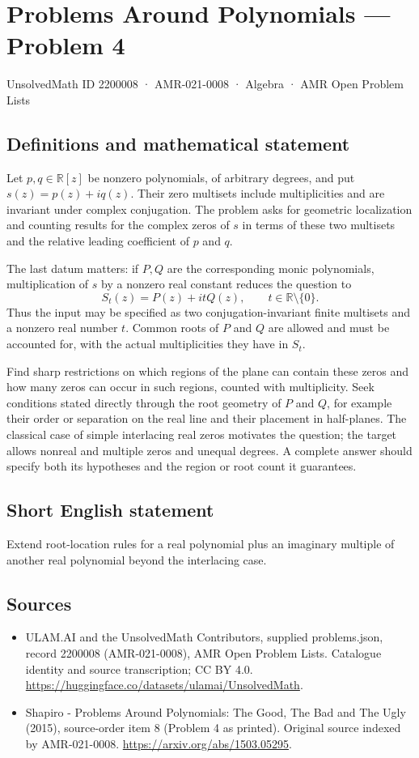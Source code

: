 \documentclass[11pt,a4paper]{article}
\begin{document}
\section*{Problems Around Polynomials — Problem 4}\label{2200008}
{\small UnsolvedMath ID 2200008 · AMR-021-0008 · Algebra · AMR Open Problem Lists}
\subsection{Definitions and mathematical statement}
Let $p,q\in\mathbb R[z]$ be nonzero polynomials, of arbitrary degrees,
and put $s(z)=p(z)+iq(z)$. Their zero multisets include multiplicities
and are invariant under complex conjugation. The problem asks for
geometric localization and counting results for the complex zeros of
$s$ in terms of these two multisets and the relative leading
coefficient of $p$ and $q$.

The last datum matters: if $P,Q$ are the corresponding monic
polynomials, multiplication of $s$ by a nonzero real constant reduces
the question to
\[
 S_t(z)=P(z)+itQ(z),\qquad t\in\mathbb R\setminus\{0\}.
\]
Thus the input may be specified as two conjugation-invariant finite
multisets and a nonzero real number $t$. Common roots of $P$ and $Q$
are allowed and must be accounted for, with the actual multiplicities
they have in $S_t$.

Find sharp restrictions on which regions of the plane can contain
these zeros and how many zeros can occur in such regions, counted
with multiplicity. Seek conditions stated directly through the root
geometry of $P$ and $Q$, for example their order or separation on the
real line and their placement in half-planes. The classical case of
simple interlacing real zeros motivates the question; the target
allows nonreal and multiple zeros and unequal degrees. A complete
answer should specify both its hypotheses and the region or root
count it guarantees.
\subsection{Short English statement}
Extend root-location rules for a real polynomial plus an imaginary multiple of another real polynomial beyond the interlacing case.
\subsection{Sources}
\begin{itemize}
\item[S1] ULAM.AI and the UnsolvedMath Contributors, supplied problems.json, record 2200008 (AMR-021-0008), AMR Open Problem Lists. Catalogue identity and source transcription; CC BY 4.0.
\url{https://huggingface.co/datasets/ulamai/UnsolvedMath}.
\item[S2] Shapiro - Problems Around Polynomials: The Good, The Bad and The Ugly (2015), source-order item 8 (Problem 4 as printed). Original source indexed by AMR-021-0008.
\url{https://arxiv.org/abs/1503.05295}.
\end{itemize}
\end{document}

